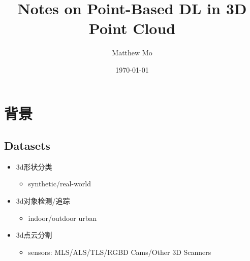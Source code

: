 \documentclass{article}
\title{\textbf{Notes on Point-Based DL in 3D Point Cloud}}
\author{Matthew Mo}
\date{\today}
\begin{document}
\maketitle
\tableofcontents

\section{背景}

\subsection{Datasets}
\begin{itemize}
    \item 3d形状分类
    \begin{itemize}
        \item synthetic/real-world
    \end{itemize}
    \item 3d对象检测/追踪
    \begin{itemize}
        \item indoor/outdoor urban
    \end{itemize}
    \item 3d点云分割
    \begin{itemize}
        \item sensors: MLS/ALS/TLS/RGBD Cams/Other 3D Scanners
    \end{itemize}
\end{itemize}
\end{document}
